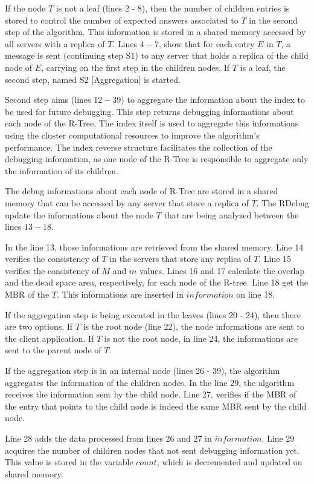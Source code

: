 If the node $T$ is not a leaf (lines 2 - 8), then the number of children entries is stored to control the number of expected answers associated to $T$ in the second step of the algorithm. 
This information is stored in a shared memory accessed by all servers with a replica of $T$. Lines $4-7$, show that for each entry $E$ in $T$, 
a message is sent (continuing step S1) to any server that holds a replica of the child node of $E$, carrying on the first step in the children nodes. 
If $T$ is a leaf, the second step, named S2 [Aggregation] is started.

Second step aims (lines $12-39$) to aggregate the information about the index to be used for future debugging.
This step returns debugging informations about each node of the R-Tree.
The index itself is used to aggregate this informations using the cluster computational resources to improve the algorithm's performance.
The index reverse structure facilitates the collection of the debugging information, 
as one node of the R-Tree is responsible to aggregate only the information of its children. 

The debug informations about each node of R-Tree are stored in a shared memory that can be accessed by any server that store a replica of $T$.
The RDebug update the informations about the node $T$ that are being analyzed between the lines $13-18$.

In the line 13, those informations are retrieved from the shared memory. 
Line 14 verifies the consistency of $T$ in the servers that store any replica of $T$. Line 15 verifies the consistency of $M$ and $m$ values. 
Lines 16 and 17 calculate the overlap and the dead space area, respectively, for each node of the R-tree. 
Line 18 get the MBR of the $T$. This informations are inserted in $information$ on line 18.

If the aggregation step is being executed in the leaves (lines 20 - 24), then there are two options.
If $T$ is the root node (line 22), the node informations are sent to the client application. 
If $T$ is not the root node, in line 24, the informations are sent to the parent node of $T$. 

If the aggregation step is in an internal node (lines 26 - 39), the algorithm aggregates the information of the children nodes. 
In the line 29, the algorithm receives the information sent by the child node. 
Line 27, verifies if the MBR of the entry that points to the child node is indeed the same MBR sent by the child node.
	
Line 28 adds the data processed from lines 26 and 27 in $information$. Line 29 acquires the number of children nodes that not sent debugging information yet. 
This value is stored in the variable $count$, which is decremented and updated on shared memory.
	
